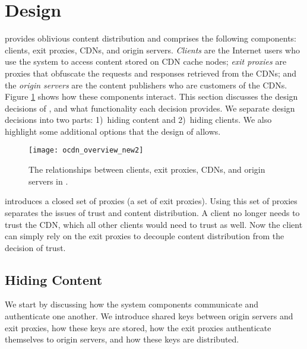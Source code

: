 \section{\system{} Design}
\label{sec:design}

\system{} provides oblivious content distribution and  
comprises the following components: clients, exit proxies, CDNs, and origin 
servers.  {\em Clients} are the Internet users who use the system to access content
stored on CDN cache nodes; {\em exit proxies} are proxies that obfuscate the requests
and responses retrieved from the CDNs; and the {\em origin servers} are the content
publishers who are customers of the CDNs.  Figure \ref{fig:ocd_overview} shows how
these components interact.  This section discusses the design decisions of \system{}, and what functionality each decision provides.  
We separate design decisions into two parts: 1)~hiding content and 2)~hiding clients.  We also highlight some additional options that the design of 
\system{} allows.

\begin{figure}[t!]
\centering
\texttt{[image: ocdn\_overview\_new2]}
\caption{The relationships between clients, exit proxies, CDNs, and origin servers in 
\system{}.}
\label{fig:ocd_overview}
\end{figure}

\system{} introduces a closed set of proxies (a set of exit proxies).  Using this set of proxies separates the issues of trust and content distribution.  A client no longer needs to trust the CDN, which all other clients would need to trust as well.  Now the client can simply rely on the exit proxies to decouple content distribution from the decision of trust.  

\subsection{Hiding Content}
\label{sec:hiding_content}

We start by discussing how the system components communicate and authenticate one another. 
We introduce shared keys between origin servers and exit proxies, how these keys
are stored, how the exit proxies authenticate themselves to origin servers, and how these 
keys are distributed.

